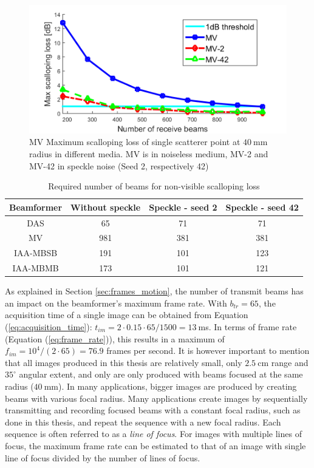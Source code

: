 \begin{figure}[ht]
    \centering
        \includegraphics[width=\linewidth]{./images/results/1/loss_vs_beams_ext.png}
	\caption{MV Maximum scalloping loss of single scatterer point at $40~$mm radius in different media. MV is in noiseless medium, MV-2 and MV-42 in speckle noise (Seed 2, respectively 42)}
	\label{fig:loss_vs_beams_ext}
\end{figure}

\begin{table}[!ht]
\centering
\begin{tabular}{| c | c | c | c |}
  \hline
  Beamformer &   Without speckle   &   Speckle - seed 2 &   Speckle - seed 42 \\
  \hline
  DAS       &   65      &   71  &   71   \\
  MV        &   981     &   381  &   381 \\
  IAA-MBSB  &   191     &   101  &   123  \\
  IAA-MBMB  &   173     &   101 &   121  \\
  \hline
 \end{tabular}
\caption{Required number of beams for non-visible scalloping loss}
\label{table:num_beams}
\end{table}

As explained in Section \ref{sec:frames_motion}, the number of transmit beams has an impact on the beamformer's maximum frame rate. With $b_{tr} = 65$, the acquisition time of a single image can be obtained from Equation (\ref{eq:acquisition_time}): $t_{im} = 2 \cdot 0.15 \cdot 65 / 1500 = 13~$ms. In terms of frame rate (Equation (\ref{eq:frame_rate})), this results in a maximum of $f_{im} = 10^4 / (2 \cdot 65) = 76.9$ frames per second.
It is however important to mention that all images produced in this thesis are relatively small, only $2.5~$cm range and $35^\circ$ angular extent, and only are only produced with beams focused at the same radius ($40~$mm). In many applications, bigger images are produced by creating beams with various focal radius. Many applications create images by sequentially transmitting and recording focused beams with a constant focal radius, such as done in this thesis, and repeat the sequence with a new focal radius. Each sequence is often referred to as a \textit{line of focus}. For images with multiple lines of focus, the maximum frame rate can be estimated to that of an image with single line of focus divided by the number of lines of focus.


